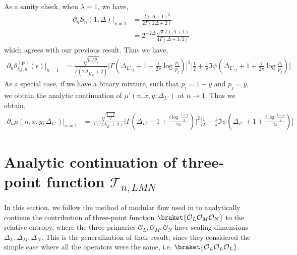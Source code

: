 \documentclass[11pt]{article}
\newcommand{\ep}{\epsilon}
\newcommand{\p}{\partial}
\newcommand{\mO}{\mathcal{O}}
\newcommand{\lb}{\left(}
\newcommand{\rb}{\right)}
\begin{document}
As a sanity check, when $\lambda =1$, we have,
\begin{align}
    \p_n S_n(1, \Delta)|_{n=1} &= \frac{\Gamma(\Delta + 1)^2}{2\Gamma(2\Delta + 2)} \\
    &= 2^{-2\Delta}\frac{\sqrt \pi\Gamma(\Delta + 1)}{4\Gamma(\Delta + 3/2)}
\end{align}
which agrees with our previous result.
Thus we have,
\begin{align}
    \p_n\theta_{i|j,n}^{(\textbf{p})}(\ep)\big|_{n=1} &= \frac{\sqrt{p_i/p_j}}{\Gamma(2\Delta_{L'_{ij}} +2)} \Bigg|\Gamma\lb \Delta_{L'_{ij}} + 1 +\frac{i }{2\pi}\log \frac{p_i }{p_j}\rb\Bigg|^2\Bigg[\frac{1}{2}+ \frac{1}{\pi} \Im \psi\lb\Delta_{L'_{ij}}+ 1 + \frac{i }{2\pi}\log \frac{p_i }{p_j}\rb\Bigg]
\end{align}
As a special case, if we have a binary mixture, such that $p_i = 1-y$ and $p_j = y$, we obtain the analytic continuation of $\mu'(n,x,y;\Delta_{L'})$ at $n\to 1$. Thus we obtain,
\begin{align}
    \p_n\mu(n,x,y;\Delta_{L'})\big|_{n=1}  &= \frac{\sqrt{\frac{1-y}{y}}}{\Gamma(2\Delta_{L'} +2)} \Bigg|\Gamma\lb \Delta_{L'} + 1 +\frac{i\log \frac{1-y}{y}}{2\pi}\rb\Bigg|^2\Bigg[\frac{1}{2}+ \frac{1}{\pi} \Im \psi\lb\Delta_{L'} + 1 + \frac{i\log \frac{1-y}{y}}{2\pi}\rb\Bigg]
\end{align}

\section{\texorpdfstring{Analytic continuation of three-point function $\mathcal{T}_{n,LMN}$}{Analytic continuation of three-point function tau}}\label{Analytic continuation of T_n,LMN}
In this section, we follow the method of modular flow used in \cite{S_rosi_2018} to analytically continue the contribution of three-point function $\braket{\mO_L \mO_M \mO_N}$ to the relative entropy, where the three primaries $\mO_L,\mO_M, \mO_N$ have scaling dimensions $\Delta_L,\Delta_M,\Delta_N$. This is the generalization of their result, since they considered the simple case where all the operators were the same, i.e. $\braket{\mO_L \mO_L \mO_L}$. 
\end{document}
